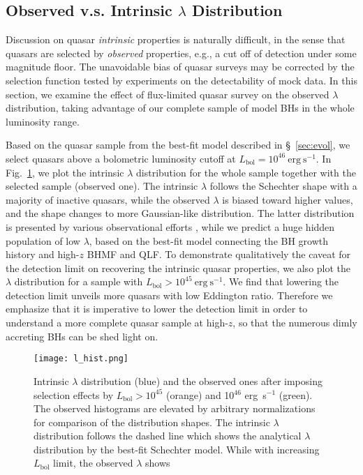 \documentclass[nolinenumbers,preprint2,tighten]{aastex631}
\newcommand{\Lbol}{L_\mathrm{bol}}
\begin{document}
\begin{CJK*}{UTF8}{gbsn}
\vspace{2mm}
\subsection{Observed v.s. Intrinsic $\lambda$ Distribution}\label{sec:ldist}
Discussion on quasar \textit{intrinsic} properties is naturally difficult, 
in the sense that quasars are selected by \textit{observed} properties, 
e.g., a cut off of detection under some magnitude floor. 
The unavoidable bias of quasar surveys may be corrected by the selection function tested 
by experiments on the detectability of mock data.
In this section, we examine the effect of flux-limited quasar survey on the observed $\lambda$ distribution, 
taking advantage of our complete sample of model BHs in the whole luminosity range. 

Based on the quasar sample from the best-fit model described in \S~\ref{sec:evol}, 
we select quasars above a bolometric luminosity cutoff at $\Lbol=10^{46}~\mathrm{erg~s^{-1}}$. 
In Fig.~\ref{fig:lhist}, we plot the intrinsic $\lambda$ distribution for the whole sample together with 
the selected sample (observed one). 
The intrinsic $\lambda$ follows the Schechter shape with a majority of inactive quasars, 
while the observed $\lambda$ is biased toward higher values, and the shape changes to 
more Gaussian-like distribution. 
The latter distribution is presented by various observational efforts 
\citep[e.g.,][]{2010AJ....140..546W,2019ApJ...873...35S}, 
while we predict a huge hidden population of low $\lambda$, 
based on the best-fit model connecting the BH growth history and high-$z$ BHMF and QLF. 
To demonstrate qualitatively the caveat for the detection limit on recovering the intrinsic quasar properties, 
we also plot the $\lambda$ distribution for a sample with $\Lbol>10^{45}~\mathrm{erg~s^{-1}}$. 
We find that lowering the detection limit unveils more quasars with low Eddington ratio. 
Therefore we emphasize that it is imperative to lower the detection limit in order to 
understand a more complete quasar sample at high-$z$, 
so that the numerous dimly accreting BHs can be shed light on.



\begin{figure}
\centering
\texttt{[image: l\_hist.png]}
\caption{
Intrinsic $\lambda$ distribution (blue) and the observed ones after imposing selection effects by $\Lbol>10^{45}$ (orange) and 10$^{46}$ erg~s$^{-1}$ (green).
The observed histograms are elevated by arbitrary normalizations for comparison of the distribution shapes.
The intrinsic $\lambda$ distribution follows the dashed line which shows the analytical $\lambda$ distribution by the best-fit Schechter model. 
While with increasing $\Lbol$ limit, the observed $\lambda$ shows 
}
\label{fig:lhist}
\end{figure}
  


\end{CJK*}
\end{document}
